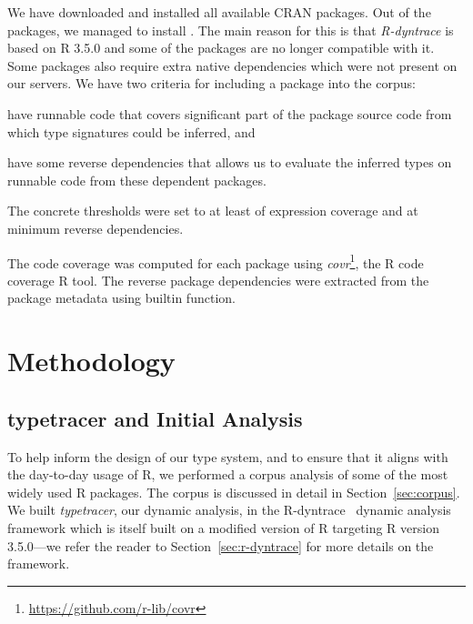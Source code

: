 \documentclass[acmsmall,review,anonymous]{acmart}\settopmatter{printfolios=true,printccs=false,printacmref=false}
\newcommand{\typetracer}{\emph{typetracer}\xspace} %
\newcommand{\rdt}{\emph{R-dyntrace}\xspace}
\newcommand{\covr}{\emph{covr}\xspace}
\begin{document}
We have downloaded and installed all available CRAN packages. Out of the
\AllCranRnd packages, we managed to install \AllLoadableRnd. The main reason
for this is that \rdt is based on R 3.5.0 and some of the packages are no
longer compatible with it. Some packages also require extra native
dependencies which were not present on our servers.  We have two criteria
for including a package into the corpus:
\begin{inparaenum}[(1)]
\item have runnable code that covers significant part of the package source
  code from which type signatures could be inferred, and
\item have some reverse dependencies that allows us to evaluate the inferred
types on runnable code from these dependent packages.
\end{inparaenum}
The concrete thresholds were set to at least \ThresholdCodeCoverage of
expression coverage and at minimum \ThresholdRevdeps reverse dependencies.

The code coverage was computed for each package using
\covr\footnote{\url{https://github.com/r-lib/covr}}, the R code coverage R
tool.  The reverse package dependencies were extracted from the package
metadata using builtin function.

%
%
%
%
%
%
\section{Methodology}

%
%
%
%
\subsection{typetracer and Initial Analysis}

To help inform the design of our type system, and to ensure that it aligns
with the day-to-day usage of R, we performed a corpus analysis of some of
the most widely used R packages.  The corpus is discussed in detail in
Section~\ref{sec:corpus}.  We built \typetracer, our dynamic analysis, in
the R-dyntrace~\cite{oopsla19} dynamic analysis framework which is itself
built on a modified version of R targeting R version 3.5.0---we refer the
reader to Section~\ref{sec:r-dyntrace} for more details on the framework.

%
%
\end{document}
